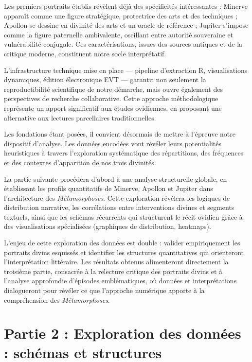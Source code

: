 \documentclass[
  letterpaper,
  DIV=11,
  numbers=noendperiod]{scrreprt}
\begin{document}
Les premiers portraits établis révèlent déjà des spécificités
intéressantes : Minerve apparaît comme une figure stratégique,
protectrice des arts et des techniques ; Apollon se dessine en divinité
des arts et un oracle de référence ; Jupiter s'impose comme la figure
paternelle ambivalente, oscillant entre autorité souveraine et
vulnérabilité conjugale. Ces caractérisations, issues des sources
antiques et de la critique moderne, constituent notre socle
interprétatif.

L'infrastructure technique mise en place --- pipeline d'extraction R,
visualisations dynamiques, édition électronique EVT --- garantit non
seulement la reproductibilité scientifique de notre démarche, mais ouvre
également des perspectives de recherche collaborative. Cette approche
méthodologique représente un apport significatif aux études ovidiennes,
en proposant une alternative aux lectures parcellaires traditionnelles.

Les fondations étant posées, il convient désormais de mettre à l'épreuve
notre dispositif d'analyse. Les données encodées vont révéler leurs
potentialités heuristiques à travers l'exploration systématique des
répartitions, des fréquences et des contextes d'apparition de nos trois
divinités.

La partie suivante procédera d'abord à une analyse structurelle globale,
en établissant les profils quantitatifs de Minerve, Apollon et Jupiter
dans l'architecture des \emph{Métamorphoses}. Cette exploration révélera
les logiques de distribution narrative, les corrélations entre
interventions divines et segments textuels, ainsi que les schémas
récurrents qui structurent le récit ovidien grâce à des visualisations
spécialisées (graphiques de distribution, heatmaps).

L'enjeu de cette exploration des données est double : valider
empiriquement les portraits divins esquissés et identifier les
structures quantitatives qui orienteront l'interprétation littéraire.
Les résultats obtenus alimenteront directement la troisième partie,
consacrée à la relecture critique des portraits divins et à l'analyse
approfondie d'épisodes emblématiques, où données et interprétations
dialogueront pour révéler ce que l'approche numérique apporte à la
compréhension des \emph{Métamorphoses}.


\chapter{Partie 2 : Exploration des données : schémas et
structures}\label{partie-2-exploration-des-donnuxe9es-schuxe9mas-et-structures}
\end{document}
